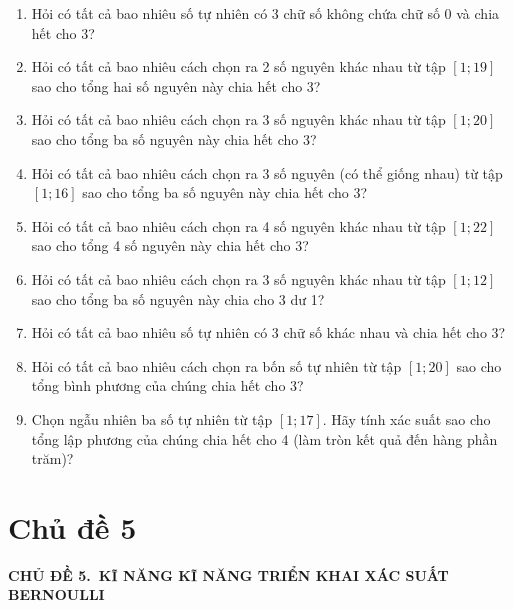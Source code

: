 \documentclass[12pt, a4paper]{article}
\begin{document}
		\begin{enumerate}[label=\textbf{Câu \arabic*:}, leftmargin=*]
				\setcounter{enumi}{0}
			\item Hỏi có tất cả bao nhiêu số tự nhiên có 3 chữ số không chứa chữ số 0 và chia hết cho 3?
			\hfill {}
			
			\item Hỏi có tất cả bao nhiêu cách chọn ra 2 số nguyên khác nhau từ tập \([1;19]\) sao cho tổng hai số nguyên này chia hết cho 3?
			\hfill {}
			
			\item Hỏi có tất cả bao nhiêu cách chọn ra 3 số nguyên khác nhau từ tập \([1;20]\) sao cho tổng ba số nguyên này chia hết cho 3?
			\hfill {}
			
			\item Hỏi có tất cả bao nhiêu cách chọn ra 3 số nguyên (có thể giống nhau) từ tập \([1;16]\) sao cho tổng ba số nguyên này chia hết cho 3?
			\hfill {}
			
			\item Hỏi có tất cả bao nhiêu cách chọn ra 4 số nguyên khác nhau từ tập \([1;22]\) sao cho tổng 4 số nguyên này chia hết cho 3?
			\hfill {}
			
			\item Hỏi có tất cả bao nhiêu cách chọn ra 3 số nguyên khác nhau từ tập \([1;12]\) sao cho tổng ba số nguyên này chia cho 3 dư 1?
			\hfill {}
			
			\item Hỏi có tất cả bao nhiêu số tự nhiên có 3 chữ số khác nhau và chia hết cho 3?
			\hfill {}
	
			\item Hỏi có tất cả bao nhiêu cách chọn ra bốn số tự nhiên từ tập \([1;20]\) sao cho tổng bình phương của chúng chia hết cho 3?
			\hfill {}
			
			\item Chọn ngẫu nhiên ba số tự nhiên từ tập \([1;17]\). Hãy tính xác suất sao cho tổng lập phương của chúng chia hết cho 4 (làm tròn kết quả đến hàng phần trăm)?
			\hfill {}
			
		\end{enumerate}
		
		\newpage
		\section*{Chủ đề 5}
		\begin{tcolorbox}[colback=headerbg, colframe=headerborder, arc=3mm, boxrule=1.5pt, halign=center]
			\textbf{\Large CHỦ ĐỀ 5.\ KĨ NĂNG KĨ NĂNG TRIỂN KHAI XÁC SUẤT BERNOULLI}
		\end{tcolorbox}
		
\end{document}
